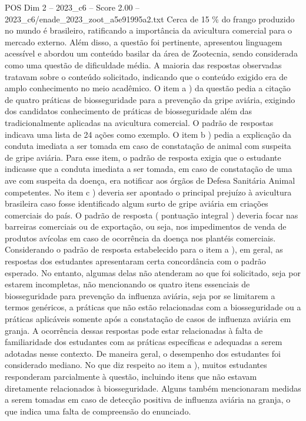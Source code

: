 \begin{textsample}{POS Dim 2 – 2023\_c6 – Score 2.00 – 2023\_c6/enade\_2023\_zoot\_a5e91995a2.txt}
Cerca de 15 \% do frango produzido no mundo é brasileiro, ratificando a importância da avicultura comercial para o mercado externo.
Além disso, a questão foi pertinente, apresentou linguagem acessível e abordou um conteúdo basilar da área de Zootecnia, sendo considerada como uma questão de dificuldade média.
A maioria das respostas observadas tratavam sobre o conteúdo solicitado, indicando que o conteúdo exigido era de amplo conhecimento no meio acadêmico.
O item a ) da questão pedia a citação de quatro práticas de biosseguridade para a prevenção da gripe aviária, exigindo dos candidatos conhecimento de práticas de biosseguridade além das tradicionalmente aplicadas na avicultura comercial.
O padrão de respostas indicava uma lista de 24 ações como exemplo.
O item b ) pedia a explicação da conduta imediata a ser tomada em caso de constatação de animal com suspeita de gripe aviária.
Para esse item, o padrão de resposta exigia que o estudante indicasse que a conduta imediata a ser tomada, em caso de constatação de uma ave com suspeita da doença, era notificar aos órgãos de Defesa Sanitária Animal competentes.
No item c ) deveria ser apontado o principal prejuízo à avicultura brasileira caso fosse identificado algum surto de gripe aviária em criações comerciais do país.
O padrão de resposta ( pontuação integral ) deveria focar nas barreiras comerciais ou de exportação, ou seja, nos impedimentos de venda de produtos avícolas em caso de ocorrência da doença nos plantéis comerciais.
Considerando o padrão de resposta estabelecido para o item a ), em geral, as respostas dos estudantes apresentaram certa concordância com o padrão esperado.
No entanto, algumas delas não atenderam ao que foi solicitado, seja por estarem incompletas, não mencionando os quatro itens essenciais de biosseguridade para prevenção da influenza aviária, seja por se limitarem a termos genéricos, a práticas que não estão relacionadas com a biosseguridade ou a práticas aplicáveis somente após a constatação de casos de influenza aviária em granja.
A ocorrência dessas respostas pode estar relacionadas à falta de familiaridade dos estudantes com as práticas específicas e adequadas a serem adotadas nesse contexto.
De maneira geral, o desempenho dos estudantes foi considerado mediano.
No que diz respeito ao item a ), muitos estudantes responderam parcialmente à questão, incluindo itens que não estavam diretamente relacionados à biosseguridade.
Alguns também mencionaram medidas a serem tomadas em caso de detecção positiva de influenza aviária na granja, o que indica uma falta de compreensão do enunciado.

\end{textsample}
